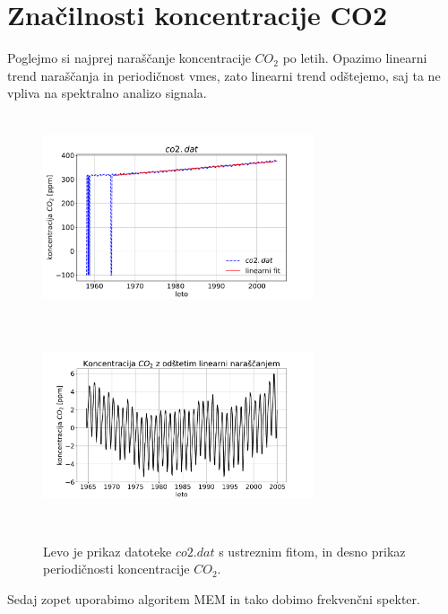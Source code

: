 \documentclass[11pt, a4paper]{article}
\begin{document}
\section{Značilnosti koncentracije CO2}
Poglejmo si najprej naraščanje koncentracije $CO_2$ po letih. Opazimo linearni trend naraščanja in periodičnost vmes, zato linearni trend odštejemo, saj ta ne vpliva na spektralno analizo signala.
\begin{figure}[H]
\centering
  \includegraphics[width=8cm,height=6cm]{druga_prvi.pdf}
  \includegraphics[width=8cm,height=6cm]{druga_prvi2.pdf}
\caption{Levo je prikaz datoteke $co2.dat$ s ustreznim fitom, in desno prikaz periodičnosti koncentracije $CO_2$.}
\end{figure}
Sedaj zopet uporabimo algoritem MEM in tako dobimo frekvenčni spekter.
\end{document}
